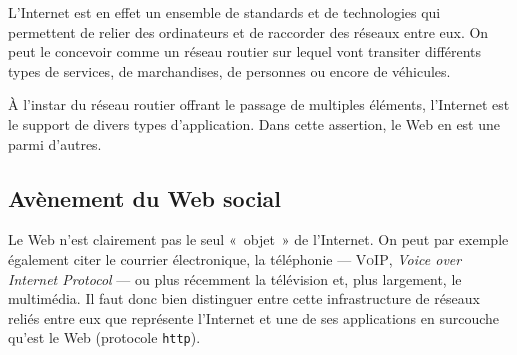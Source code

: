 L'Internet est en effet un ensemble de standards et de technologies qui permettent de relier des ordinateurs et de raccorder des réseaux entre eux. On peut le concevoir comme un réseau routier sur lequel vont transiter différents types de services, de marchandises, de personnes ou encore de véhicules.

À l'instar du réseau routier offrant le passage de multiples éléments, l'Internet est le support de divers types d'application. Dans cette assertion, le Web en est une parmi d'autres.


\subsection[Avènement du Web social]{Avènement du Web social}
\label{sub:II.1.1}

Le Web n'est clairement pas le seul «~objet~» de l'Internet. On peut par exemple également citer le courrier électronique, la téléphonie --- \textsc{VoIP}, \textit{Voice over Internet Protocol} --- ou plus récemment la télévision et, plus largement, le multimédia. Il faut donc bien distinguer entre cette infrastructure de réseaux reliés entre eux que représente l'Internet et une de ses applications en surcouche qu'est le Web (protocole \texttt{http}). 


